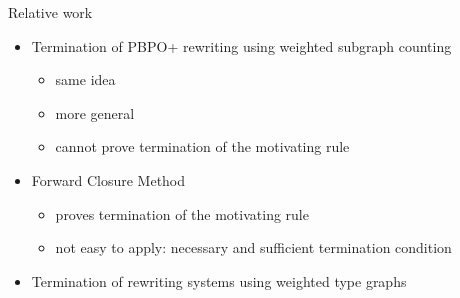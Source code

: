 \documentclass{beamer}
\begin{document}
\begin{frame}{Relative work}
    \begin{itemize}
         \item Termination of PBPO+ rewriting using weighted subgraph counting~\cite{overbeek2024termination_lmcs} 
      \begin{itemize}
        \item \alert{same idea}
        \item \alert{more general}
        \item \alert{cannot prove termination of the motivating rule}
      \end{itemize}
    \item Forward Closure Method~\cite{plump1995ontermination}
    \begin{itemize}
    \item \alert{proves termination of the motivating rule}
    \item \alert{not easy to apply}: necessary and sufficient termination condition
    \end{itemize}
        \item Termination of rewriting systems using weighted type graphs
        ~\cite{zantema2014termination,bruggink2014termination,bruggink2015proving,endrullis2024generalized_arxiv_v2,qiu2025termination_nwf_v2_acceptedgcm}

\end{itemize}
\end{frame}
\end{document}
